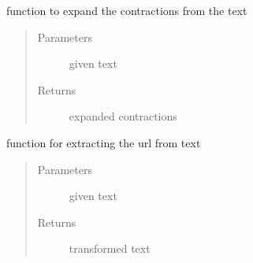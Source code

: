 \documentclass[letterpaper,10pt,english]{sphinxmanual}
\begin{document}
\begin{fulllineitems}
\label{\detokenize{index:data_preprocessing.data_preprocessing_functions.expand_contractions}}
\sphinxAtStartPar
function to expand the contractions from the text
\begin{quote}\begin{description}
\item[{Parameters}] \leavevmode
\sphinxAtStartPar
{} \textendash{} given text

\item[{Returns}] \leavevmode
\sphinxAtStartPar
expanded contractions

\end{description}\end{quote}

\end{fulllineitems}


\begin{fulllineitems}
\label{\detokenize{index:data_preprocessing.data_preprocessing_functions.extract_urls}}
\sphinxAtStartPar
function for extracting the url from text
\begin{quote}\begin{description}
\item[{Parameters}] \leavevmode
\sphinxAtStartPar
{} \textendash{} given text

\item[{Returns}] \leavevmode
\sphinxAtStartPar
transformed text

\end{description}\end{quote}

\end{fulllineitems}

\end{document}

